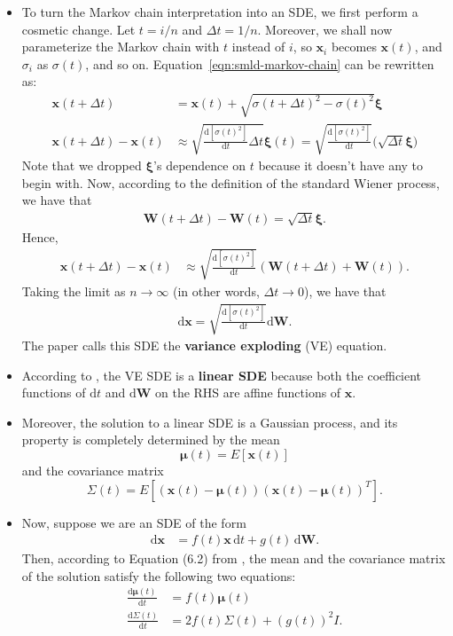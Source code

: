 \documentclass[10pt]{article}
\newcommand{\dee}{\mathrm{d}}
\newcommand{\ve}[1]{\mathbf{#1}}
\newcommand{\ves}[1]{\boldsymbol{#1}}
\begin{document}
\begin{itemize}
  \item To turn the Markov chain interpretation into an SDE, we first perform a cosmetic change. Let $t = i/n$ and $\Delta t = 1/n$. Moreover, we shall now parameterize the Markov chain with $t$ instead of $i$, so $\ve{x}_i$ becomes $\ve{x}(t)$, and $\sigma_i$ as $\sigma(t)$, and so on. Equation~\eqref{eqn:smld-markov-chain} can be rewritten as:
  \begin{align*}
    \ve{x}(t + \Delta t) 
    &= \ve{x}(t) + \sqrt{\sigma(t + \Delta t)^2 - \sigma(t)^2} \ves{\xi} \\
    \ve{x}(t + \Delta t) - \ve{x}(t) 
    &\approx \sqrt{\frac{\dee [\sigma(t)^2]}{\dee t} \Delta t} \ves{\xi}(t)
    = \sqrt{\frac{\dee [\sigma(t)^2]}{\dee t}} \Big( \sqrt{\Delta t}\ves{\xi} \Big)
  \end{align*}
  Note that we dropped $\ves{\xi}$'s dependence on $t$ because it doesn't have any to begin with. Now, according to the definition of the standard Wiener process, we  have that
  \begin{align*}
    \ve{W}(t+\Delta t) - \ve{W}(t) = \sqrt{\Delta t} \ves{\xi}.
  \end{align*}
  Hence, 
  \begin{align*}
    \ve{x}(t + \Delta t) - \ve{x}(t) 
    &\approx \sqrt{\frac{\dee [\sigma(t)^2]}{\dee t}} (\ve{W}(t + \Delta t) + \ve{W}(t)).  
  \end{align*}
  Taking the limit as $n \rightarrow \infty$ (in other words, $\Delta t \rightarrow 0$), we have that
  \begin{align*}
    \dee \ve{x} = \sqrt{\frac{\dee [\sigma(t)^2]}{\dee t}} \dee \ve{W}.
  \end{align*}
  The paper calls this SDE the {\bf variance exploding} (VE) equation.

  \item According to \cite{Sarkka:2019}, the VE SDE is a {\bf linear SDE} because both the coefficient functions of $\dee t$ and $\dee \ve{W}$ on the RHS are affine functions of $\ve{x}$. 

  \item Moreover, the solution to a linear SDE is a Gaussian process, and its property is completely determined by the mean $$\ves{\mu}(t) = E[\ve{x}(t)]$$ and the covariance matrix $$\Sigma(t) = E[(\ve{x}(t) - \ves{\mu}(t))(\ve{x}(t) - \ves{\mu}(t))^T].$$
  
  \item Now, suppose we are an SDE of the form
  \begin{align*}
    \dee \ve{x} &= f(t)\ve{x}\, \dee t + g(t)\, \dee \ve{W}.
  \end{align*}
  Then, according to Equation (6.2) from \cite{Sarkka:2019}, the mean and the covariance matrix of the solution satisfy the following two equations:
  \begin{align}
    \frac{\dee \ves{\mu}(t)}{\dee t} &= f(t) \ves{\mu}(t) \label{eqn:linear-sde-mean} \\
    \frac{\dee \Sigma(t)}{\dee t} &= 2 f(t) \Sigma(t) + (g(t))^2 I \label{eqn:linear-sde-covariance}.
  \end{align}
  

\end{itemize}
\end{document}
